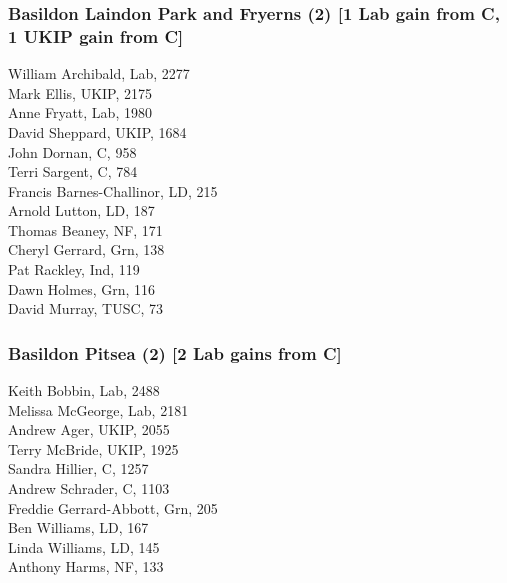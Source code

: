 \documentclass[a4paper,openany,10pt]{book}
\begin{document}
\subsubsection*{Basildon Laindon Park and Fryerns (2) \hspace*{\fill}\nolinebreak[1]%
\enspace\hspace*{\fill}
[1 Lab gain from C, 1 UKIP gain from C]}



William Archibald, Lab, 2277\\
Mark Ellis, UKIP, 2175\\
Anne Fryatt, Lab, 1980\\
David Sheppard, UKIP, 1684\\
John Dornan, C, 958\\
Terri Sargent, C, 784\\
{Francis Barnes-Challinor}, LD, 215\\
Arnold Lutton, LD, 187\\
Thomas Beaney, NF, 171\\
Cheryl Gerrard, Grn, 138\\
Pat Rackley, Ind, 119\\
Dawn Holmes, Grn, 116\\
David Murray, TUSC, 73\\


\subsubsection*{Basildon Pitsea (2) \hspace*{\fill}\nolinebreak[1]%
\enspace\hspace*{\fill}
[2 Lab gains from C]}



Keith Bobbin, Lab, 2488\\
Melissa McGeorge, Lab, 2181\\
Andrew Ager, UKIP, 2055\\
Terry McBride, UKIP, 1925\\
Sandra Hillier, C, 1257\\
Andrew Schrader, C, 1103\\
{Freddie Gerrard-Abbott}, Grn, 205\\
Ben Williams, LD, 167\\
Linda Williams, LD, 145\\
Anthony Harms, NF, 133\\
\end{document}
